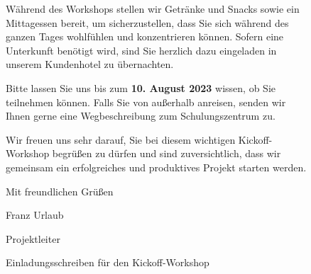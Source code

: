 \begin{figure}[ht]
\begin{minipage}{\textwidth}
		\noindent Während des Workshops stellen wir Getränke und Snacks sowie ein Mittagessen bereit, um sicherzustellen, dass Sie sich während des ganzen Tages wohlfühlen und konzentrieren können. Sofern eine Unterkunft benötigt wird, sind Sie herzlich dazu eingeladen in unserem Kundenhotel zu übernachten.
		
		\vspace*{0.5\baselineskip}
		
		\noindent Bitte lassen Sie uns bis zum \textbf{10. August 2023} wissen, ob Sie teilnehmen können. Falls Sie von außerhalb anreisen, senden wir Ihnen gerne eine Wegbeschreibung zum Schulungszentrum zu.
		
		\vspace*{0.5\baselineskip}
		
		\noindent Wir freuen uns sehr darauf, Sie bei diesem wichtigen Kickoff-Workshop begrüßen zu dürfen und sind zuversichtlich, dass wir gemeinsam ein erfolgreiches und produktives Projekt starten werden.
		
		\vspace*{1.5\baselineskip}
		
		\noindent Mit freundlichen Grüßen
		
		\vspace*{0.5\baselineskip}
		
		\noindent Franz Urlaub
		
		\noindent Projektleiter
		
		\vspace*{2\baselineskip}
		
		\caption{Einladungsschreiben für den Kickoff-Workshop}
		\label{fig:einladung} 
	\end{minipage}
\end{figure}










